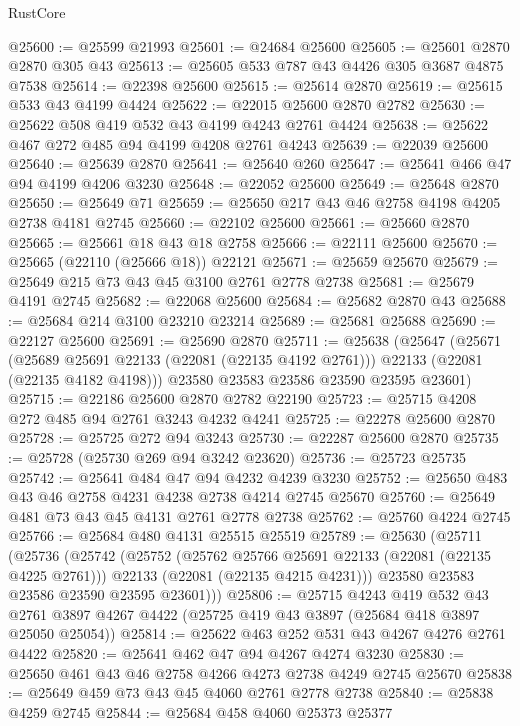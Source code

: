 \begin{lexlean}{RustCore}
\begin{coremodule}
@25600 := @25599 @21993
@25601 := @24684 @25600
@25605 := @25601 @2870 @2870 @305 @43
@25613 := @25605 @533 @787 @43 @4426 @305 @3687 @4875 @7538
@25614 := @22398 @25600
@25615 := @25614 @2870
@25619 := @25615 @533 @43 @4199 @4424
@25622 := @22015 @25600 @2870 @2782
@25630 := @25622 @508 @419 @532 @43 @4199 @4243 @2761 @4424
@25638 := @25622 @467 @272 @485 @94 @4199 @4208 @2761 @4243
@25639 := @22039 @25600
@25640 := @25639 @2870
@25641 := @25640 @260
@25647 := @25641 @466 @47 @94 @4199 @4206 @3230
@25648 := @22052 @25600
@25649 := @25648 @2870
@25650 := @25649 @71
@25659 := @25650 @217 @43 @46 @2758 @4198 @4205 @2738 @4181 @2745
@25660 := @22102 @25600
@25661 := @25660 @2870
@25665 := @25661 @18 @43 @18 @2758
@25666 := @22111 @25600
@25670 := @25665 (@22110 (@25666 @18)) @22121
@25671 := @25659 @25670
@25679 := @25649 @215 @73 @43 @45 @3100 @2761 @2778 @2738
@25681 := @25679 @4191 @2745
@25682 := @22068 @25600
@25684 := @25682 @2870 @43
@25688 := @25684 @214 @3100 @23210 @23214
@25689 := @25681 @25688
@25690 := @22127 @25600
@25691 := @25690 @2870
@25711 := @25638
    (@25647
      (@25671
        (@25689 @25691 @22133 (@22081 (@22135 @4192 @2761)))
        @22133
        (@22081 (@22135 @4182 @4198)))
      @23580
      @23583
      @23586
      @23590
      @23595
      @23601)
@25715 := @22186 @25600 @2870 @2782 @22190
@25723 := @25715 @4208 @272 @485 @94 @2761 @3243 @4232 @4241
@25725 := @22278 @25600 @2870
@25728 := @25725 @272 @94 @3243
@25730 := @22287 @25600 @2870
@25735 := @25728 (@25730 @269 @94 @3242 @23620)
@25736 := @25723 @25735
@25742 := @25641 @484 @47 @94 @4232 @4239 @3230
@25752 := @25650 @483 @43 @46 @2758 @4231 @4238 @2738 @4214 @2745 @25670
@25760 := @25649 @481 @73 @43 @45 @4131 @2761 @2778 @2738
@25762 := @25760 @4224 @2745
@25766 := @25684 @480 @4131 @25515 @25519
@25789 := @25630
    (@25711
      (@25736
        (@25742
          (@25752
            (@25762 @25766 @25691 @22133 (@22081 (@22135 @4225 @2761)))
            @22133
            (@22081 (@22135 @4215 @4231)))
          @23580
          @23583
          @23586
          @23590
          @23595
          @23601)))
@25806 := @25715
    @4243
    @419
    @532
    @43
    @2761
    @3897
    @4267
    @4422
    (@25725 @419 @43 @3897 (@25684 @418 @3897 @25050 @25054))
@25814 := @25622 @463 @252 @531 @43 @4267 @4276 @2761 @4422
@25820 := @25641 @462 @47 @94 @4267 @4274 @3230
@25830 := @25650 @461 @43 @46 @2758 @4266 @4273 @2738 @4249 @2745 @25670
@25838 := @25649 @459 @73 @43 @45 @4060 @2761 @2778 @2738
@25840 := @25838 @4259 @2745
@25844 := @25684 @458 @4060 @25373 @25377

\end{coremodule}
\end{lexlean}
